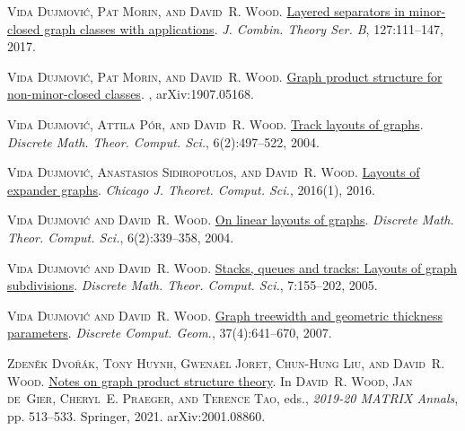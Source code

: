 \documentclass[kpfonts]{patmorin}
\begin{document}
	\textsc{Vida Dujmovi{\'c}, Pat Morin, and David~R. Wood}.
	\newblock \href{https://doi.org/10.1016/j.jctb.2017.05.006}{Layered separators
		in minor-closed graph classes with applications}.
	\newblock \emph{J. Combin. Theory Ser. B}, 127:111--147, 2017.
	
	\textsc{Vida Dujmovi{\'c}, Pat Morin, and David~R. Wood}.
	\newblock \href{http://arxiv.org/abs/1907.05168}{Graph product structure for
		non-minor-closed classes}.
	, arXiv:1907.05168.
	
	\textsc{Vida Dujmovi{\'c}, Attila P\'or, and David~R. Wood}.
	\newblock \href{http://dmtcs.episciences.org/315}{Track layouts of graphs}.
	\newblock \emph{Discrete Math. Theor. Comput. Sci.}, 6(2):497--522, 2004.
	
	\textsc{Vida Dujmovi{\'c}, Anastasios Sidiropoulos, and David~R. Wood}.
	\newblock \href{https://doi.org/10.4086/cjtcs.2016.001}{Layouts of expander
		graphs}.
	\newblock \emph{Chicago J. Theoret. Comput. Sci.}, 2016(1), 2016.
	
	\textsc{Vida Dujmovi{\'c} and David~R. Wood}.
	\newblock \href{http://dmtcs.episciences.org/317}{On linear layouts of graphs}.
	\newblock \emph{Discrete Math. Theor. Comput. Sci.}, 6(2):339--358, 2004.
	
	\textsc{Vida Dujmovi{\'c} and David~R. Wood}.
	\newblock \href{http://dmtcs.episciences.org/346}{Stacks, queues and tracks:
		Layouts of graph subdivisions}.
	\newblock \emph{Discrete Math. Theor. Comput. Sci.}, 7:155--202, 2005.
	
	\textsc{Vida Dujmovi{\'c} and David~R. Wood}.
	\newblock \href{https://doi.org/10.1007/s00454-007-1318-7}{Graph treewidth and
		geometric thickness parameters}.
	\newblock \emph{Discrete Comput. Geom.}, 37(4):641--670, 2007.
	
	\textsc{Zden{\v{e}}k Dvo{\v{r}}{\'a}k, Tony Huynh, Gwena\"el Joret, Chun-Hung
		Liu, and David~R. Wood}.
	\newblock \href{https://doi.org/10.1007/978-3-030-62497-2_32}{Notes on graph
		product structure theory}.
	\newblock In \textsc{David~R. Wood, Jan de~Gier, Cheryl~E. Praeger, and Terence
		Tao}, eds., \emph{2019-20 MATRIX Annals}, pp. 513--533. Springer, 2021.
	\newblock arXiv:2001.08860.
	
\end{document}
